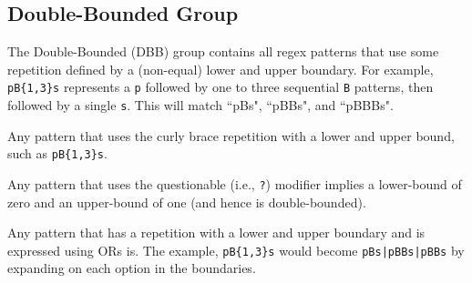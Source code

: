 \subsection{Double-Bounded Group}
The Double-Bounded (DBB) group contains all regex patterns that use some repetition defined by a (non-equal) lower and upper boundary.  For example,  \verb!pB{1,3}s! represents a \verb!p! followed by one to three sequential \verb!B! patterns, then followed by a single \verb!s!.  This will match ``pBs", ``pBBs", and ``pBBBs".

\begin{description}  \itemsep -1pt
\item[D1:] Any pattern that  uses the curly brace repetition with a lower and upper bound, such as  \verb!pB{1,3}s!. 
\item[D2:] Any pattern that uses the questionable (i.e., \verb!?!) modifier implies a lower-bound of zero and an upper-bound of one (and hence is double-bounded). 
\item[D3:] Any pattern that has a repetition with a lower and upper boundary and is expressed using ORs is.  The example, \verb!pB{1,3}s! would become \verb!pBs|pBBs|pBBs! by expanding on each option in the boundaries.


\end{description}
